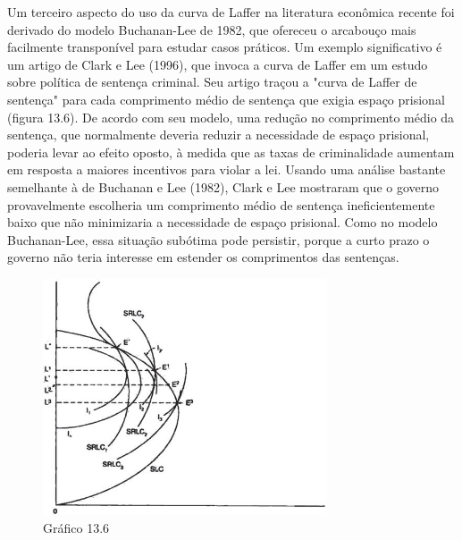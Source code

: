 \documentclass[12pt]{article}
\begin{document}
Um terceiro aspecto do uso da curva de Laffer na literatura econômica recente foi derivado do modelo Buchanan-Lee de 1982, que ofereceu o arcabouço mais facilmente transponível para estudar casos práticos. Um exemplo significativo é um artigo de Clark e Lee (1996), que invoca a curva de Laffer em um estudo sobre política de sentença criminal. Seu artigo traçou a "curva de Laffer de sentença" para cada comprimento médio de sentença que exigia espaço prisional (figura 13.6). De acordo com seu modelo, uma redução no comprimento médio da sentença, que normalmente deveria reduzir a necessidade de espaço prisional, poderia levar ao efeito oposto, à medida que as taxas de criminalidade aumentam em resposta a maiores incentivos para violar a lei. Usando uma análise bastante semelhante à de Buchanan e Lee (1982), Clark e Lee mostraram que o governo provavelmente escolheria um comprimento médio de sentença ineficientemente baixo que não minimizaria a necessidade de espaço prisional. Como no modelo Buchanan-Lee, essa situação subótima pode persistir, porque a curto prazo o governo não teria interesse em estender os comprimentos das sentenças.

\begin{figure}[H]
    \centering
    \caption{Gráfico 13.6}
    \includegraphics[width=0.75\textwidth]{4º Período/História do Pensamento Econômico/Tradução HPE/Tradução Tópico 9.3/figura 6.png}
\end{figure}
\end{document}
